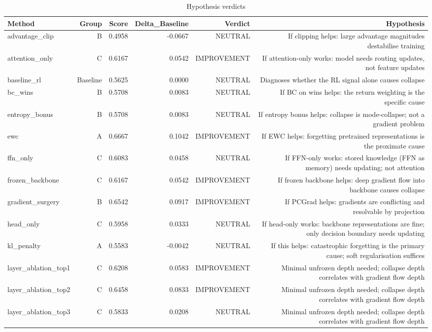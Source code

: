 \begin{table}[htbp]
\centering
\caption{Hypothesis verdicts}
\label{tab:hyp-verdicts}
\begin{tabular}{lrrrrr}
\toprule
\textbf{Method} & \textbf{Group} & \textbf{Score} & \textbf{Delta\_Baseline} & \textbf{Verdict} & \textbf{Hypothesis} \\
\midrule
advantage\_clip & B & 0.4958 & -0.0667 & NEUTRAL & If clipping helps: large advantage magnitudes destabilise training \\
attention\_only & C & 0.6167 & 0.0542 & IMPROVEMENT & If attention-only works: model needs routing updates, not feature updates \\
baseline\_rl & Baseline & 0.5625 & 0.0000 & NEUTRAL & Diagnoses whether the RL signal alone causes collapse \\
bc\_wins & B & 0.5708 & 0.0083 & NEUTRAL & If BC on wins helps: the return weighting is the specific cause \\
entropy\_bonus & B & 0.5708 & 0.0083 & NEUTRAL & If entropy bonus helps: collapse is mode-collapse; not a gradient problem \\
ewc & A & 0.6667 & 0.1042 & IMPROVEMENT & If EWC helps: forgetting pretrained representations is the proximate cause \\
ffn\_only & C & 0.6083 & 0.0458 & NEUTRAL & If FFN-only works: stored knowledge (FFN as memory) needs updating; not attention \\
frozen\_backbone & C & 0.6167 & 0.0542 & IMPROVEMENT & If frozen backbone helps: deep gradient flow into backbone causes collapse \\
gradient\_surgery & B & 0.6542 & 0.0917 & IMPROVEMENT & If PCGrad helps: gradients are conflicting and resolvable by projection \\
head\_only & C & 0.5958 & 0.0333 & NEUTRAL & If head-only works: backbone representations are fine; only decision boundary needs updating \\
kl\_penalty & A & 0.5583 & -0.0042 & NEUTRAL & If this helps: catastrophic forgetting is the primary cause; soft regularisation suffices \\
layer\_ablation\_top1 & C & 0.6208 & 0.0583 & IMPROVEMENT & Minimal unfrozen depth needed; collapse depth correlates with gradient flow depth \\
layer\_ablation\_top2 & C & 0.6458 & 0.0833 & IMPROVEMENT & Minimal unfrozen depth needed; collapse depth correlates with gradient flow depth \\
layer\_ablation\_top3 & C & 0.5833 & 0.0208 & NEUTRAL & Minimal unfrozen depth needed; collapse depth correlates with gradient flow depth \\

\end{tabular}
\end{table}
